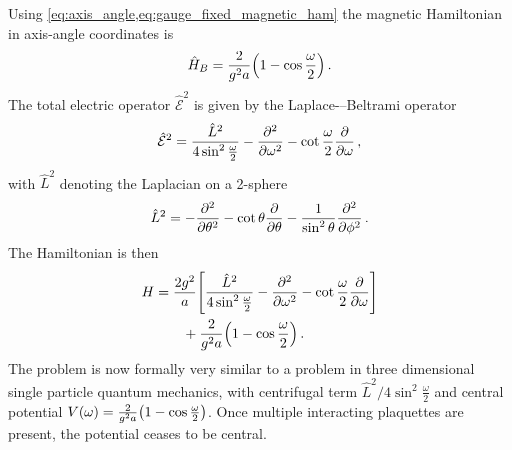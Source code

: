 \documentclass[reprint,superscriptaddress,pra,nofootinbib,preprintnumbers,floatfix]{revtex4-1}
\begin{document}
Using \cref{eq:axis_angle,eq:gauge_fixed_magnetic_ham} the magnetic Hamiltonian in axis-angle coordinates is
%
\begin{equation}\label{eq:HB_single}
    \hat{H}_B = \frac{2}{g^2 a} \pqty{1 - \cos\frac{\omega}{2}} \,.
\end{equation}
%
The total electric operator $\hat{\mathcal{E}}^2$ is given by the Laplace-–Beltrami operator
%
\begin{equation}\label{eq:Esq}
    \hat{\mathcal{E}}^2 = \frac{\hat L^2}{4\sin^2\frac{\omega}{2}}
                          - \pdv[2]{\omega} - \cot\frac{\omega}{2} \pdv{\omega} \,,
\end{equation}
%
with $\hat{L}^2$ denoting the Laplacian on a 2-sphere
%
\begin{equation}
    \hat{L}^2 = -\pdv[2]{\theta} - \cot\theta\pdv{\theta}
                - \frac{1}{\sin^2\theta}\pdv[2]{\phi} \,.
\end{equation}
%
The Hamiltonian is then
%
\begin{equation}\label{eq:single_ham}
  \begin{split}
    H &= \frac{2 g^2}{a} \bqty{\frac{\hat{L}^2}{4\sin^2\frac{\omega}{2}}
 - \pdv[2]{\omega} - \cot\frac{\omega}{2} \pdv{\omega}} \\
& \qquad + \frac{2}{g^2 a} \pqty{1 - \cos \frac{\omega}{2}} \,.
  \end{split}
\end{equation}
%
The problem is now formally very similar to a problem in three dimensional single particle quantum mechanics, with centrifugal term $\hat{L}^2/4\sin^2\frac{\omega}{2}$ and central potential $V(\omega) = \frac{2}{g^2 a} \pqty{1 - \cos \frac{\omega}{2}}$. 
%
Once multiple interacting plaquettes are present, the potential ceases to be central.
%
\end{document}
